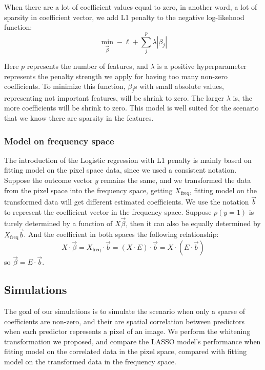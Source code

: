 \documentclass[12pt]{article}
\begin{document}
When there are a lot of coefficient values equal to zero, in another word, a lot of sparsity in coefficient vector, we add L1 penalty to the negative log-likehood function:
\[
  \min_{\vec{\beta}} - \ell + \sum_j^p \lambda | \beta_j |
\]

Here \( p \) represents the number of features, and \( \lambda \) is a positive hyperparameter represents the penalty strength we apply for having too many non-zero coefficients. To minimize this function, \( \beta_j \)s with small absolute values, representing not important features, will be shrink to zero. The larger \( \lambda \) is, the more coefficients will be shrink to zero. This model is well suited for the scenario that we know there are sparsity in the features.

\subsubsection{Model on frequency space}

The introduction of the Logistic regression with L1 penalty is mainly based on fitting model on the pixel space data, since we used a consistent notation. Suppose the outcome vector \( y \) remains the same, and we transformed the data from the pixel space into the frequency space, getting \( X_{\text{freq}} \), fitting model on the transformed data will get different estimated coefficients. We use the notation \( \vec{b} \) to represent the coefficient vector in the frequency space. Suppose \( p(y = 1) \) is turely determined by a function of \( X \vec{\beta} \), then it can also be equally determined by \( X_{\text{freq}} \vec{b} \). And the coefficient in both spaces the following relationship:
\[
  X \cdot \vec{\beta} = X_{\text{freq}} \cdot \vec{b} = (X \cdot E) \cdot \vec{b} = X \cdot (E \cdot \vec{b})
\]
so \( \vec{\beta} = E \cdot \vec{b} \).

\subsection{Simulations}

The goal of our simulations is to simulate the scenario when only a sparse of coefficients are non-zero, and their are spatial correlation between predictors when each predictor represents a pixel of an image. We perform the whitening transformation we proposed, and compare the LASSO model's performance when fitting model on the correlated data in the pixel space, compared with fitting model on the transformed data in the frequency space.
\end{document}

